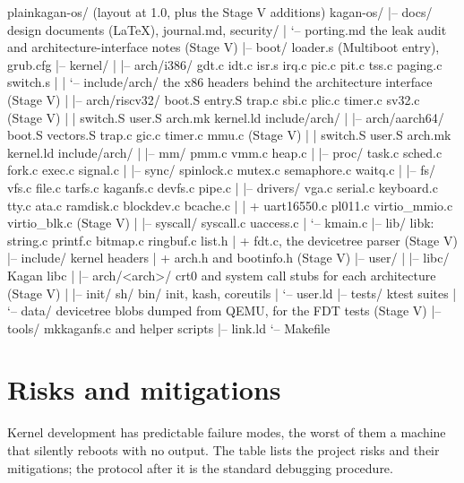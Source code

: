 \documentclass[11pt,a4paper]{article}
\begin{document}
\begin{lst}{plain}{kagan-os/ (layout at 1.0, plus the Stage V additions)}
kagan-os/
|-- docs/                  design documents (LaTeX), journal.md, security/
|   `-- porting.md         the leak audit and architecture-interface notes        (Stage V)
|-- boot/                  loader.s (Multiboot entry), grub.cfg
|-- kernel/
|   |-- arch/i386/         gdt.c idt.c isr.s irq.c pic.c pit.c tss.c paging.c switch.s
|   |   `-- include/arch/  the x86 headers behind the architecture interface      (Stage V)
|   |-- arch/riscv32/      boot.S entry.S trap.c sbi.c plic.c timer.c sv32.c      (Stage V)
|   |                      switch.S user.S arch.mk kernel.ld include/arch/
|   |-- arch/aarch64/      boot.S vectors.S trap.c gic.c timer.c mmu.c            (Stage V)
|   |                      switch.S user.S arch.mk kernel.ld include/arch/
|   |-- mm/                pmm.c vmm.c heap.c
|   |-- proc/              task.c sched.c fork.c exec.c signal.c
|   |-- sync/              spinlock.c mutex.c semaphore.c waitq.c
|   |-- fs/                vfs.c file.c tarfs.c kaganfs.c devfs.c pipe.c
|   |-- drivers/           vga.c serial.c keyboard.c tty.c ata.c ramdisk.c blockdev.c bcache.c
|   |                      + uart16550.c pl011.c virtio_mmio.c virtio_blk.c       (Stage V)
|   |-- syscall/           syscall.c uaccess.c
|   `-- kmain.c
|-- lib/                   libk: string.c printf.c bitmap.c ringbuf.c list.h
|                          + fdt.c, the devicetree parser                         (Stage V)
|-- include/               kernel headers
|                          + arch.h and bootinfo.h                                (Stage V)
|-- user/
|   |-- libc/              Kagan libc
|   |-- arch/<arch>/       crt0 and system call stubs for each architecture       (Stage V)
|   |-- init/ sh/ bin/     init, kash, coreutils
|   `-- user.ld
|-- tests/                 ktest suites
|   `-- data/              devicetree blobs dumped from QEMU, for the FDT tests   (Stage V)
|-- tools/                 mkkaganfs.c and helper scripts
|-- link.ld
`-- Makefile
\end{lst}

\section{Risks and mitigations}

Kernel development has predictable failure modes, the worst of them a machine that silently reboots with no output.
The table lists the project risks and their mitigations; the protocol after it is the standard debugging procedure.
\end{document}
